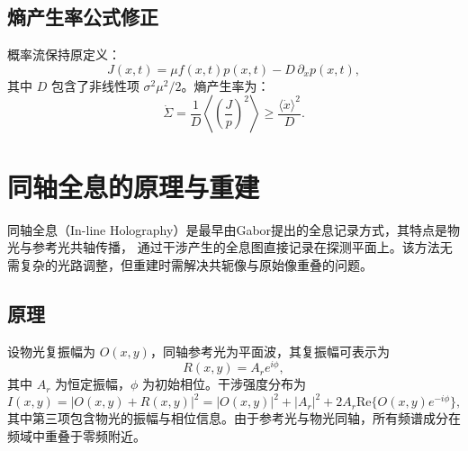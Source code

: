 \documentclass[a4paper]{report}
\begin{document}
\subsection{熵产生率公式修正}
概率流保持原定义：
\begin{equation}
J(x,t) = \mu f(x,t)p(x,t) - D \, \partial_x p(x,t),
\end{equation}
其中 $D$ 包含了非线性项 $\sigma^2 \mu^2 / 2$。熵产生率为：
\begin{equation}
\dot{\Sigma} = \frac{1}{D} \left\langle \left( \frac{J}{p} \right)^2 \right\rangle
\geq \frac{\langle \dot{x} \rangle^2}{D}.
\end{equation}

\section{同轴全息的原理与重建}
同轴全息（In-line Holography）是最早由Gabor提出的全息记录方式，其特点是物光与参考光共轴传播，
通过干涉产生的全息图直接记录在探测平面上。该方法无需复杂的光路调整，但重建时需解决共轭像与原始像重叠的问题。
\subsection{原理}
设物光复振幅为 $O(x,y)$，同轴参考光为平面波，其复振幅可表示为
\begin{equation}
R(x,y) = A_r e^{i\phi},
\end{equation}
其中 $A_r$ 为恒定振幅，$\phi$ 为初始相位。干涉强度分布为
\begin{equation}
I(x,y) = |O(x,y) + R(x,y)|^2 = |O(x,y)|^2 + |A_r|^2 + 2A_r \text{Re}\{O(x,y)e^{-i\phi}\},
\end{equation}
其中第三项包含物光的振幅与相位信息。由于参考光与物光同轴，所有频谱成分在频域中重叠于零频附近。
\end{document}
